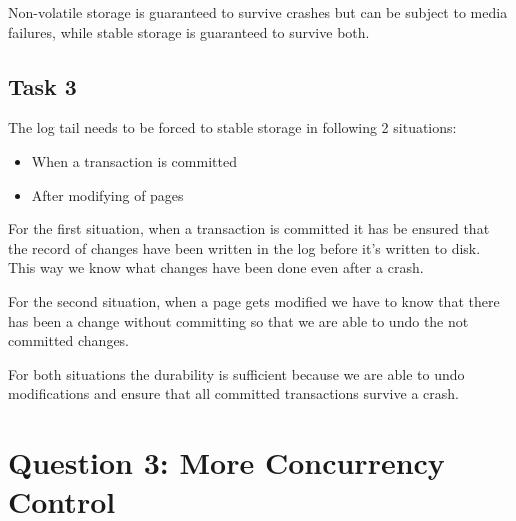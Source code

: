 \documentclass[12pt,a4paper]{article}
\begin{document}
Non-volatile storage is guaranteed to survive crashes but can be subject to media failures, while stable storage is guaranteed to survive both.


\subsection{Task 3}
The log tail needs to be forced to stable storage in following 2 situations:
\begin{itemize}
	\item When a transaction is committed
	\item After modifying of pages	
\end{itemize}

For the first situation, when a transaction is committed it has be ensured that the record of changes have been written in the log before it's written to disk.
This way we know what changes have been done even after a crash.

For the second situation, when a page gets modified we have to know that there has been a change without committing so that we are able to undo the not committed changes. 

For both situations the durability is sufficient because we are able to undo modifications and ensure that all committed transactions survive a crash.

\section{Question 3: More Concurrency Control}
\end{document}
